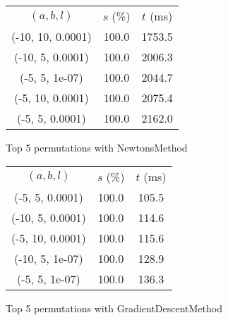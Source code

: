 \begin{figure}[H]
\label{fig:param_comp_NegativeEntropy_BisectionSearch}
\begin{subfigure}[ht]{.5\textwidth}
\begin{tabular}{|c|c|c|}
\hline
\rowcolor{gray!25}
\multicolumn{3}{|c|}{NewtonsMethod} \\
\hline
\rowcolor{gray!25}
$(a,b,l)$ & $s$ (\%) & $t$ (ms) \\
\hline
(-10, 10, 0.0001) & 100.0 & 1753.5 \\
(-10, 5, 0.0001) & 100.0 & 2006.3 \\
(-5, 5, 1e-07) & 100.0 & 2044.7 \\
(-5, 10, 0.0001) & 100.0 & 2075.4 \\
(-5, 5, 0.0001) & 100.0 & 2162.0 \\
\hline
\end{tabular}
\caption{Top 5 permutations with NewtonsMethod}
\label{subfig:param_comp_NegativeEntropy_NewtonsMethod_BisectionSearch}
\end{subfigure}
\hfill
\begin{subfigure}[ht]{.5\textwidth}
\begin{tabular}{|c|c|c|}
\hline
\rowcolor{gray!25}
\multicolumn{3}{|c|}{GradientDescentMethod} \\
\hline
\rowcolor{gray!25}
$(a,b,l)$ & $s$ (\%) & $t$ (ms) \\
\hline
(-5, 5, 0.0001) & 100.0 & 105.5 \\
(-10, 5, 0.0001) & 100.0 & 114.6 \\
(-5, 10, 0.0001) & 100.0 & 115.6 \\
(-10, 5, 1e-07) & 100.0 & 128.9 \\
(-5, 5, 1e-07) & 100.0 & 136.3 \\
\hline
\end{tabular}
\caption{Top 5 permutations with GradientDescentMethod}
\label{subfig:param_comp_NegativeEntropy_GradientDescentMethod_BisectionSearch}
\end{subfigure}
\hfill
\begin{subfigure}[ht]{.5\textwidth}
\begin{tabular}{|c|c|c|}
\hline
\rowcolor{gray!25}
\multicolumn{3}{|c|}{ConjugateGradientMethod} \\
\hline

\end{tabular}
\end{subfigure}
\end{figure}
